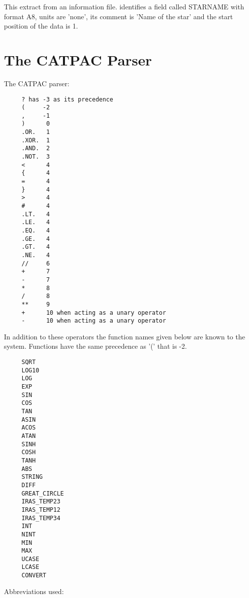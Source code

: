       This extract from an information file. identifies a field called STARNAME
      with format A8, units are 'none', its comment is 'Name of the star'
      and the start position of the data is 1.

\newpage
\section{The CATPAC Parser}
\label{ap:parser}

The CATPAC parser:

\begin{small}
\begin{verbatim}
     ? has -3 as its precedence
     (     -2
     ,     -1
     )      0
     .OR.   1
     .XOR.  1
     .AND.  2
     .NOT.  3
     <      4
     {      4
     =      4
     }      4
     >      4
     #      4
     .LT.   4
     .LE.   4
     .EQ.   4
     .GE.   4
     .GT.   4
     .NE.   4
     //     6
     +      7
     -      7
     *      8
     /      8
     **     9
     +      10 when acting as a unary operator
     -      10 when acting as a unary operator
\end{verbatim}
\end{small}

In addition to these operators the function names given below are known to the
system.  Functions have the same precedence as '(' that is -2.

\begin{small}
\begin{verbatim}
     SQRT
     LOG10
     LOG
     EXP
     SIN
     COS
     TAN
     ASIN
     ACOS
     ATAN
     SINH
     COSH
     TANH
     ABS
     STRING
     DIFF
     GREAT_CIRCLE
     IRAS_TEMP23
     IRAS_TEMP12
     IRAS_TEMP34
     INT
     NINT
     MIN
     MAX
     UCASE
     LCASE
     CONVERT
\end{verbatim}
\end{small}

Abbreviations used:

